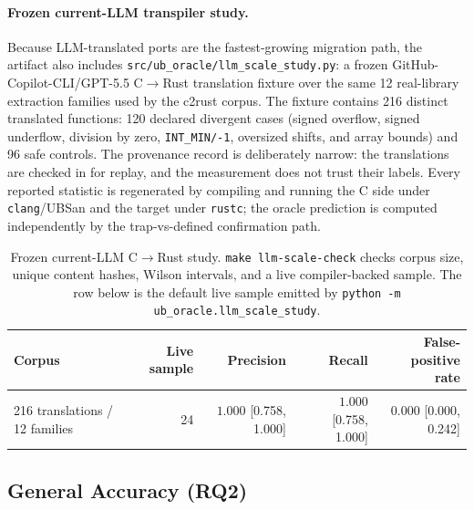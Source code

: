 \documentclass[10pt,a4paper]{article}
\begin{document}
\paragraph{Frozen current-LLM transpiler study.}
Because LLM-translated ports are the fastest-growing migration path, the artifact
also includes \texttt{src/ub\_oracle/llm\_scale\_study.py}: a frozen
GitHub-Copilot-CLI/GPT-5.5 C$\to$Rust translation fixture over the same 12
real-library extraction families used by the c2rust corpus. The fixture contains
216 distinct translated functions: 120 declared divergent cases
(signed overflow, signed underflow, division by zero, \texttt{INT\_MIN/-1},
oversized shifts, and array bounds) and 96 safe controls. The provenance record is
deliberately narrow: the translations are checked in for replay, and the
measurement does not trust their labels. Every reported statistic is regenerated
by compiling and running the C side under \texttt{clang}/UBSan and the target under
\texttt{rustc}; the oracle prediction is computed independently by the
trap-vs-defined confirmation path.

\begin{table}[t]
\centering
\small
\caption{Frozen current-LLM C$\to$Rust study. \texttt{make llm-scale-check}
checks corpus size, unique content hashes, Wilson intervals, and a live
compiler-backed sample. The row below is the default live sample emitted by
\texttt{python -m ub\_oracle.llm\_scale\_study}.}
\label{tab:llm-scale}
\begin{tabular}{@{}lrrrr@{}}
\toprule
Corpus & Live sample & Precision & Recall & False-positive rate \\
\midrule
216 translations / 12 families & 24 & $1.000$ [0.758, 1.000] &
$1.000$ [0.758, 1.000] & $0.000$ [0.000, 0.242] \\
\bottomrule
\end{tabular}
\end{table}

\subsection{General Accuracy (RQ2)}\label{sec:eval-accuracy}
\end{document}

